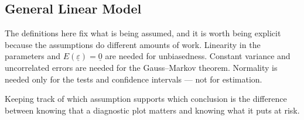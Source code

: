 \documentclass[11pt,a4paper]{article}
\theoremstyle{definition}
\begin{document}
\subsection{General Linear Model}
The definitions here fix what is being assumed, and it is worth being explicit
because the assumptions do different amounts of work. Linearity in the
parameters and $E\left(\underline{\varepsilon}\right)=\underline{0}$ are needed
for unbiasedness. Constant variance and uncorrelated errors are needed for the
Gauss--Markov theorem. Normality is needed only for the tests and confidence
intervals --- not for estimation.

Keeping track of which assumption supports which conclusion is the difference
between knowing that a diagnostic plot matters and knowing what it puts at
risk.
\end{document}
